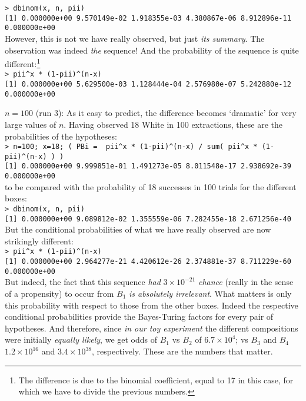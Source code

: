 \documentclass[11pt]{article}
\begin{document}
\begin{description}
              {\small 
              \verb|> dbinom(x, n, pii)|\\
              \verb|[1] 0.000000e+00 9.570149e-02 1.918355e-03 4.380867e-06 8.912896e-11 0.000000e+00|
              }\\
              However, this is not we have really observed, but just 
              {\em its summary}. The observation was indeed {\em the} sequence!
              And the probability of the sequence is quite 
              different:\footnote{The difference is due to the binomial 
               coefficient, 
               equal to 17 in this case,
               for which we have to divide the previous numbers.}\\
              {\small 
              \verb|> pii^x * (1-pii)^(n-x)|\\
              \verb|[1] 0.000000e+00 5.629500e-03 1.128444e-04 2.576980e-07 5.242880e-12 0.000000e+00|
              }
\item{$n=100$ (run 3):} As it easy to predict, the difference becomes `dramatic' for very large values of $n$.
               Having observed 18 White in 100 extractions, 
               these are the probabilities of the hypotheses:\\
              {\small 
              \verb|> n=100; x=18; ( PBi =  pii^x * (1-pii)^(n-x) / sum( pii^x * (1-pii)^(n-x) ) )|\\
              \verb|[1] 0.000000e+00 9.999851e-01 1.491273e-05 8.011548e-17 2.938692e-39 0.000000e+00|
              }\\
              to be compared with the probability of 18 successes in 100 trials 
              for the different boxes:\\
              {\small 
              \verb|> dbinom(x, n, pii)|\\
              \verb|[1] 0.000000e+00 9.089812e-02 1.355559e-06 7.282455e-18 2.671256e-40|
              }\\
              But the conditional probabilities of what we have really observed are now strikingly different:\\
              {\small 
              \verb|> pii^x * (1-pii)^(n-x)|\\
              \verb|[1] 0.000000e+00 2.964277e-21 4.420612e-26 2.374881e-37 8.711229e-60  0.000000e+00|
              }\\
              But indeed, the fact that this sequence {\em had}  $3\times 10^{-21}$ {\em chance} 
              (really in the sense of a propensity)
              to occur from 
              $B_1$ {\em is absolutely irrelevant}. 
              What matters is only this probability
              with respect to those from the other boxes.
              Indeed the respective conditional probabilities 
              provide the Bayes-Turing factors for every pair of hypotheses. 
              And therefore, since {\em in our toy experiment} the different compositions were initially
              {\em equally likely}, we get odds of $B_1$ vs $B_2$ of $6.7\times 10^4$;
              vs  $B_3$ and  $B_4$  $1.2\times 10^{16}$ and  $3.4\times 10^{38}$, respectively. These are the numbers that matter.
\end{description}
\end{document}
